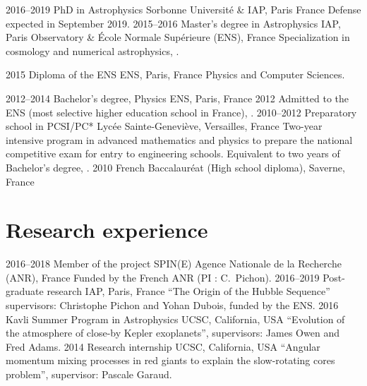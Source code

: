 \documentclass[]{cv-style}
\begin{document}
\begin{entrylist}
\entry
{2016--2019}
{PhD in Astrophysics}
{Sorbonne Université \& IAP, Paris France}
{Defense expected in September 2019.}
\entry
{2015--2016}
{Master's degree in Astrophysics}
{IAP, Paris Observatory \& École Normale Supérieure (ENS), France}
{Specialization in cosmology and numerical astrophysics, .}

\entry
{2015}
{Diploma of the ENS}
{ENS, Paris, France}
{Physics and Computer Sciences.}

\entryshort
{2012--2014}
{Bachelor's degree, Physics}
{ENS, Paris, France}
\entryshortnohl
{2012}
{Admitted to the ENS (most selective higher education school in France), .}
{}
\entrynohl
{2010--2012}
{Preparatory school in PCSI/PC*}
{Lycée Sainte-Geneviève, Versailles, France}
{Two-year intensive program in advanced mathematics and physics to prepare the national competitive exam
for entry to engineering schools. Equivalent to two years of Bachelor's degree, .
}
\entryshortnohl
{2010}
{French Baccalauréat (High school diploma), }
{Saverne, France}

\end{entrylist}


\section{Research experience}
\begin{entrylist}
\entry
{2016--2018}
{Member of the project SPIN(E)}
{Agence Nationale de la Recherche (ANR), France}
{ Funded by the French ANR (PI : C.~Pichon).}
\entry
{2016--2019}
{Post-graduate research}
{IAP, Paris, France}
{``The Origin of the Hubble Sequence'' supervisors: Christophe Pichon and Yohan Dubois, funded by the ENS.}
\entry
{2016}
{Kavli Summer Program in Astrophysics}
{UCSC, California, USA}
{``Evolution of the atmosphere of close-by Kepler exoplanets'', supervisors: James Owen and Fred Adams.}
\entry
{2014}
{Research internship}
{UCSC, California, USA}
{``Angular momentum mixing processes in red giants to explain
  the slow-rotating cores problem'', supervisor: Pascale Garaud.}
\end{entrylist}
\end{document}
